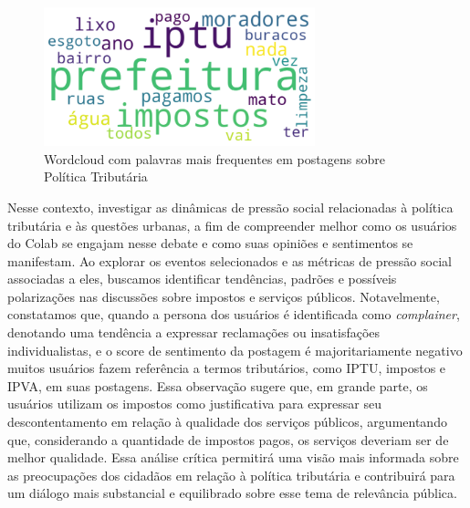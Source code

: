 \begin{figure}[htb]
	\centering
	\includegraphics[width=0.7\textwidth]{images/wordcloud_taxes.png}
	\caption{Wordcloud com palavras mais frequentes em postagens sobre Política Tributária}
	\label{fig:wordcloud_taxes}
\end{figure}

Nesse contexto, investigar as dinâmicas de pressão social relacionadas à política tributária e às questões urbanas, a fim de compreender melhor como os usuários do Colab se engajam nesse debate e como suas opiniões e sentimentos se manifestam. Ao explorar os eventos selecionados e as métricas de pressão social associadas a eles, buscamos identificar tendências, padrões e possíveis polarizações nas discussões sobre impostos e serviços públicos. Notavelmente, constatamos que, quando a persona dos usuários é identificada como \textit{complainer}, denotando uma tendência a expressar reclamações ou insatisfações individualistas, e o score de sentimento da postagem é majoritariamente negativo muitos usuários fazem referência a termos tributários, como IPTU, impostos e IPVA, em suas postagens. Essa observação sugere que, em grande parte, os usuários utilizam os impostos como justificativa para expressar seu descontentamento em relação à qualidade dos serviços públicos, argumentando que, considerando a quantidade de impostos pagos, os serviços deveriam ser de melhor qualidade. Essa análise crítica permitirá uma visão mais informada sobre as preocupações dos cidadãos em relação à política tributária e contribuirá para um diálogo mais substancial e equilibrado sobre esse tema de relevância pública.

